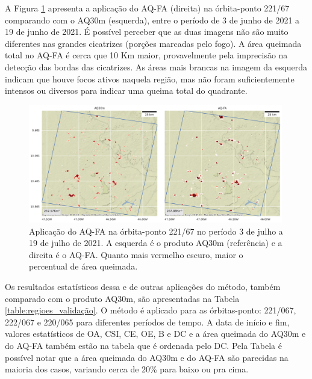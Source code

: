 \documentclass[cic,tc]{iiufrgs}
\begin{document}
A Figura \ref{fig:validacao_221_67} apresenta a aplicação do AQ-FA (direita) na órbita-ponto 221/67 comparando com o AQ30m (esquerda), entre o período de 3 de junho de 2021 a 19 de junho de 2021. É possível perceber que as duas imagens não são muito diferentes nas grandes cicatrizes (porções marcadas pelo fogo). A área queimada total no AQ-FA é cerca que 10 Km maior, provavelmente pela imprecisão na detecção das bordas das cicatrizes. As áreas mais brancas na imagem da esquerda indicam que houve focos ativos naquela região, mas não foram suficientemente intensos ou diversos para indicar uma queima total do quadrante.

\begin{figure}[H]
    \caption{Aplicação do AQ-FA na órbita-ponto 221/67 no período 3 de julho a 19 de julho de 2021. A esquerda é o produto AQ30m (referência) e a direita é o AQ-FA. Quanto mais vermelho escuro, maior o percentual de área queimada.}
    \begin{center}
        \includegraphics[width=30em]{validacao_221_67}
    \end{center}
    \label{fig:validacao_221_67}
\end{figure}

Os resultados estatísticos dessa e de outras aplicações do método, também comparado com o produto AQ30m, são apresentadas na Tabela \ref{table:regioes_validação}. O método é aplicado para as órbitas-ponto: 221/067, 222/067 e 220/065 para diferentes períodos de tempo. A data de início e fim, valores estatísticos de OA, CSI, CE, OE, B e DC e a área queimada do AQ30m e do AQ-FA também estão na tabela que é ordenada pelo DC. Pela Tabela é possível notar que a área queimada do AQ30m e do AQ-FA são parecidas na maioria dos casos, variando cerca de 20\% para baixo ou pra cima.
\end{document}
